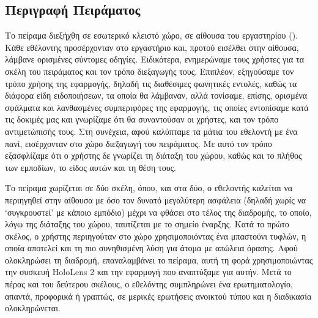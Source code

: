 \subsection{Περιγραφή Πειράματος}

Το πείραμα διεξήχθη σε εσωτερικό κλειστό χώρο, σε αίθουσα του εργαστηρίου (). Κάθε εθέλοντης προσέρχονταν στο εργαστήριο και, προτού εισέλθει στην αίθουσα, λάμβανε ορισμένες σύντομες οδηγίες. Ειδικότερα, ενημερώναμε τους χρήστες για τα σκέλη του πειράματος και τον τρόπο διεξαγωγής τους. Επιπλέον, εξηγούσαμε τον τρόπο χρήσης της εφαρμογής, δηλαδή τις διαθέσιμες φωνητικές εντολές, καθώς τα διάφορα είδη ειδοποιήσεων, τα οποία θα λάμβαναν, αλλά τονίσαμε, επίσης, ορισμένα σφάλματα και λανθασμένες συμπεριφόρες της εφαρμογής, τις οποίες εντοπίσαμε κατά τις δοκιμές μας και γνωρίζαμε ότι θα συναντούσαν οι χρήστες, και τον τρόπο αντιμετώπισής τους. Στη συνέχεια, αφού καλύπταμε τα μάτια του εθελοντή με ένα πανί, εισέρχονταν στο χώρο διεξαγωγή του πειράματος. Με αυτό τον τρόπο εξασφλίζαμε ότι ο χρήστης δε γνωρίζει τη διάταξη του χώρου, καθώς και το πλήθος των εμποδίων, το είδος αυτών και τη θέση τους.

Το πείραμα χωρίζεται σε δύο σκέλη, όπου, και στα δύο, ο εθελοντής καλείται να περιηγηθεί στην αίθουσα με όσο τον δυνατό μεγαλύτερη ασφάλεια (δηλαδή χωρίς να `συγκρουστεί' με κάποιο εμπόδιο) μέχρι να φθάσει στο τέλος της διαδρομής, το οποίο, λόγω της διάταξης του χώρου, ταυτίζεται με το σημείο έναρξης. Κατά το πρώτο σκέλος, ο χρήστης περιηγούταν στο χώρο χρησιμοποιόντας ένα μπαστούνι τυφλών, η οποία αποτελεί και τη πιο συνηθισμένη λύση για άτομα με απώλεια όρασης. Αφού ολοκληρώσει τη διαδρομή, επαναλαμβάνει το πείραμα, αυτή τη φορά χρησιμοποιώντας την συσκευή HoloLens 2 και την εφαρμογή που αναπτύξαμε για αυτήν. Μετά το πέρας και του δεύτερου σκέλους, ο εθελόντης συμπληρώνει ένα ερωτηματολογίο, απαντά, προφορικά ή γραπτώς, σε μερικές ερωτήσεις ανοικτού τύπου και η διαδικασία ολοκληρώνεται.

